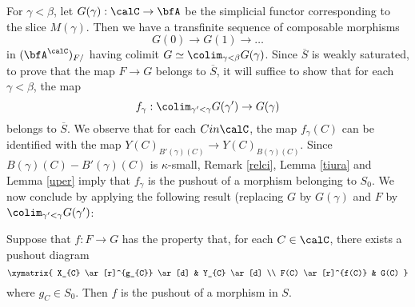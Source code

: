 For $\gamma < \beta$, let $G(\gamma): \calC \rightarrow \bfA$ be the simplicial functor corresponding to the slice $M(\gamma)$. Then we have a transfinite sequence of composable morphisms 
$$ G(0) \rightarrow G(1) \rightarrow \ldots$$
in $(\bfA^{\calC})_{F/}$ having colimit $G \simeq \colim_{\gamma < \beta} G(\gamma)$. 
Since $\overline{S}$ is weakly saturated, to prove that the map $F \rightarrow G$ belongs to $\overline{S}$, it will suffice to show that for each $\gamma < \beta$, the map 
$$ f_{\gamma}: \colim_{\gamma' < \gamma} G(\gamma') \rightarrow G(\gamma)$$
belongs to $\overline{S}$. We observe that for each $C in \calC$, the map
$f_{\gamma}(C)$ can be identified with the map
$Y(C)_{ B'(\gamma)(C) } \rightarrow Y(C)_{ B(\gamma)(C) }$. Since $B(\gamma)(C) - B'(\gamma)(C)$ is $\kappa$-small, Remark \ref{relci}, Lemma \ref{tiura} and Lemma \ref{uper} imply that $f_{\gamma}$ is the pushout of a morphism belonging to $S_0$. We now conclude by applying the following result (replacing $G$ by $G(\gamma)$ and $F$ by $\colim_{\gamma' < \gamma} G(\gamma')$:

\begin{lemma}
Suppose that $f: F \rightarrow G$ has the property that, for each $C \in \calC$, there exists a pushout diagram
$$ \xymatrix{ X_{C} \ar[r]^{g_{C}} \ar[d] & Y_{C} \ar[d] \\
F(C) \ar[r]^{f(C)} & G(C) }$$
where $g_{C} \in S_0$. Then $f$ is the pushout of a morphism in $S$.
\end{lemma}

